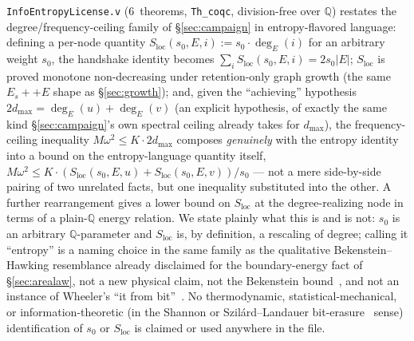 \documentclass[10pt,twocolumn]{article}
\begin{document}
\texttt{InfoEntropyLicense.v} (6~theorems, \texttt{Th\_coqc}, division-free
over $\mathbb{Q}$) restates the degree/frequency-ceiling family of
\S\ref{sec:campaign} in entropy-flavored language: defining a per-node
quantity $S_{\mathrm{loc}}(s_0,E,i):=s_0\cdot\deg_E(i)$ for an arbitrary
weight $s_0$, the handshake identity becomes
$\sum_i S_{\mathrm{loc}}(s_0,E,i)=2s_0\lvert E\rvert$; $S_{\mathrm{loc}}$ is
proved monotone non-decreasing under retention-only graph growth (the same
$E_s{+}{+}E$ shape as \S\ref{sec:growth}); and, given the ``achieving''
hypothesis $2d_{\max}=\deg_E(u)+\deg_E(v)$ (an explicit hypothesis, of
exactly the same kind \S\ref{sec:campaign}'s own spectral ceiling already
takes for $d_{\max}$), the frequency-ceiling inequality $M\omega^2\le
K\cdot2d_{\max}$ composes \emph{genuinely} with the entropy identity into a
bound on the entropy-language quantity itself,
$M\omega^2\le K\cdot(S_{\mathrm{loc}}(s_0,E,u)+S_{\mathrm{loc}}(s_0,E,v))/s_0$
--- not a mere side-by-side pairing of two unrelated facts, but one
inequality substituted into the other. A further rearrangement gives a
lower bound on $S_{\mathrm{loc}}$ at the degree-realizing node in terms of a
plain-$\mathbb{Q}$ energy relation. We state plainly what this is and is
not: $s_0$ is an arbitrary $\mathbb{Q}$-parameter and $S_{\mathrm{loc}}$ is,
by definition, a rescaling of degree; calling it ``entropy'' is a naming
choice in the same family as the qualitative Bekenstein--Hawking
resemblance already disclaimed for the boundary-energy fact of
\S\ref{sec:arealaw}, not a new physical claim, not the Bekenstein
bound~\cite{bekenstein1973}, and not an instance of Wheeler's ``it from
bit''~\cite{wheeler1990}. No thermodynamic, statistical-mechanical, or
information-theoretic (in the Shannon or Szil\'ard--Landauer
bit-erasure~\cite{szilard1929,landauer1961} sense) identification of $s_0$
or $S_{\mathrm{loc}}$ is claimed or used anywhere in the file.
\end{document}
